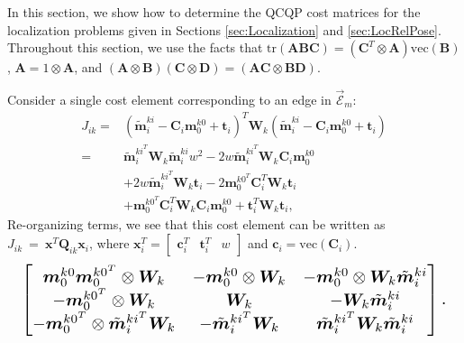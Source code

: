 \documentclass[lettersize,journal]{IEEEtran}
\newcommand{\EdgeSet}{\vec{\bm{\mathcal{E}}}}
\newcommand{\vect}[1]{\mbox{vec}(#1)}
\newcommand{\tr}[1]{\mbox{tr}\left(#1\right)}
\begin{document}
In this section, we show how to determine the QCQP cost matrices for the localization problems given in Sections \ref{sec:Localization} and \ref{sec:LocRelPose}. Throughout this section, we use the facts that $ \tr{\bm{A}\bm{B}\bm{C}} = (\bm{C}^T\otimes\bm{A}) \vect{\bm{B}}$, $ \bm{A} = 1\otimes\bm{A} $, and $ (\bm{A}\otimes\bm{B})(\bm{C}\otimes\bm{D}) = (\bm{AC}\otimes\bm{BD}) $\cite{magnusMatrixDifferentialCalculus2019}. 

Consider a single cost element corresponding to an edge in $\EdgeSet_m $:
\begin{align*}
	J_{ik}=&(\tilde{\bm{m}}_i^{ki} - \bm{C}_i\bm{m}_0^{k0} + \bm{t}_i)^T \bm{W}_k (\tilde{\bm{m}}_i^{ki} - \bm{C}_i\bm{m}_0^{k0} + \bm{t}_i) \\
	=& \tilde{\bm{m}}_i^{ki^T}\bm{W}_k\tilde{\bm{m}}_i^{ki} w^2 - 2 w\tilde{\bm{m}}_i^{ki^T}\bm{W}_k\bm{C}_i\bm{m}_0^{k0}  \\
	&+ 2 w\tilde{\bm{m}}_i^{ki^T}\bm{W}_k\bm{t}_i -2\bm{m}_0^{k0^T}\bm{C}_i^T\bm{W}_k\bm{t}_i\\
	& + \bm{m}_0^{k0^T}\bm{C}_i^T\bm{W}_k\bm{C}_i\bm{m}_0^{k0} + \bm{t}_i^T\bm{W}_k\bm{t}_i,
\end{align*}
Re-organizing terms, we see that this cost element can be written as $J_{ik}~=~\bm{x}^T\bm{Q}_{ik}\bm{x}_i$, where $ \bm{x}_i^T = \begin{bmatrix} \bm{c}_i^T &  \bm{t}_i^T & w \end{bmatrix} $ and $ \bm{c}_i=\vect{\bm{C}_i} $.
\begin{equation*}
	\resizebox{0.98\columnwidth}{!}{$\begin{bmatrix}
			\bm{m}_0^{k0}\bm{m}_0^{k0^T} \otimes \bm{W}_k  & -\bm{m}_0^{k0}\otimes\bm{W}_k & -\bm{m}_0^{k0}\otimes\bm{W}_k\tilde{\bm{m}}_i^{ki}\\
			 -\bm{m}_0^{k0^T}\otimes\bm{W}_k & \bm{W}_k & -\bm{W}_k\tilde{\bm{m}}_i^{ki} \\
			-\bm{m}_0^{k0^T}\otimes\tilde{\bm{m}}_i^{ki^T}\bm{W}_k & -\tilde{\bm{m}}_i^{ki^T}\bm{W}_k & \tilde{\bm{m}}_i^{ki^T}\bm{W}_k\tilde{\bm{m}}_i^{ki}
		\end{bmatrix}.$}
\end{equation*}
\end{document}
